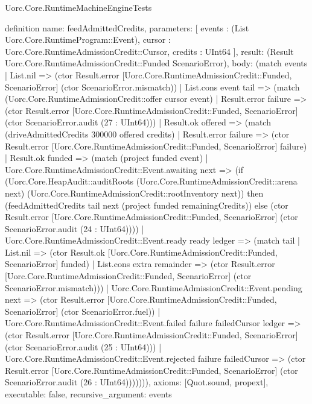 \begin{lexlean}{Uorc.Core.RuntimeMachineEngineTests}
\begin{semanticmodule}
definition{
  name: feedAdmittedCredits,
  parameters: [
    events : (List Uorc.Core.RuntimeProgram::Event),
    cursor : Uorc.Core.RuntimeAdmissionCredit::Cursor,
    credits : UInt64
  ],
  result: (Result Uorc.Core.RuntimeAdmissionCredit::Funded ScenarioError),
  body: (match events
    | List.nil => (ctor Result.error [Uorc.Core.RuntimeAdmissionCredit::Funded, ScenarioError] (ctor ScenarioError.mismatch))
    | List.cons event tail => (match (Uorc.Core.RuntimeAdmissionCredit::offer cursor event)
      | Result.error failure => (ctor Result.error [Uorc.Core.RuntimeAdmissionCredit::Funded, ScenarioError] (ctor ScenarioError.audit (27 : UInt64)))
      | Result.ok offered => (match (driveAdmittedCredits 300000 offered credits)
        | Result.error failure => (ctor Result.error [Uorc.Core.RuntimeAdmissionCredit::Funded, ScenarioError] failure)
        | Result.ok funded => (match (project funded event)
          | Uorc.Core.RuntimeAdmissionCredit::Event.awaiting next => (if (Uorc.Core.HeapAudit::auditRoots (Uorc.Core.RuntimeAdmissionCredit::arena next) (Uorc.Core.RuntimeAdmissionCredit::rootInventory next)) then (feedAdmittedCredits tail next (project funded remainingCredits)) else (ctor Result.error [Uorc.Core.RuntimeAdmissionCredit::Funded, ScenarioError] (ctor ScenarioError.audit (24 : UInt64))))
          | Uorc.Core.RuntimeAdmissionCredit::Event.ready ready ledger => (match tail
            | List.nil => (ctor Result.ok [Uorc.Core.RuntimeAdmissionCredit::Funded, ScenarioError] funded)
            | List.cons extra remainder => (ctor Result.error [Uorc.Core.RuntimeAdmissionCredit::Funded, ScenarioError] (ctor ScenarioError.mismatch)))
          | Uorc.Core.RuntimeAdmissionCredit::Event.pending next => (ctor Result.error [Uorc.Core.RuntimeAdmissionCredit::Funded, ScenarioError] (ctor ScenarioError.fuel))
          | Uorc.Core.RuntimeAdmissionCredit::Event.failed failure failedCursor ledger => (ctor Result.error [Uorc.Core.RuntimeAdmissionCredit::Funded, ScenarioError] (ctor ScenarioError.audit (25 : UInt64)))
          | Uorc.Core.RuntimeAdmissionCredit::Event.rejected failure failedCursor => (ctor Result.error [Uorc.Core.RuntimeAdmissionCredit::Funded, ScenarioError] (ctor ScenarioError.audit (26 : UInt64))))))),
  axioms: [Quot.sound, propext],
  executable: false,
  recursive_argument: events
}


\end{semanticmodule}
\end{lexlean}
